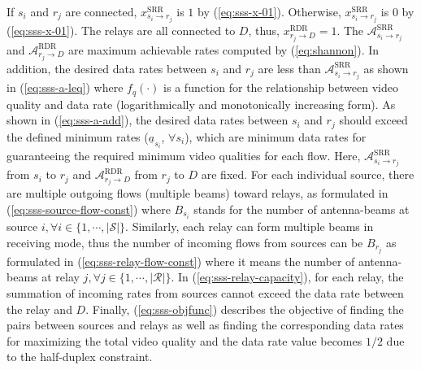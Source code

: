 \documentclass[conference]{IEEEtran}
\begin{document}
If $s_{i}$ and $r_{j}$ are connected, $x_{s_{i}\rightarrow r_{j}}^{\text{SRR}}$ is $1$ by (\ref{eq:sss-x-01}). Otherwise, $x_{s_{i}\rightarrow r_{j}}^{\text{SRR}}$ is $0$ by (\ref{eq:sss-x-01}).
The relays are all connected to $D$, thus, $x_{r_{j}\rightarrow D}^{\text{RDR}} = 1$.
The $\mathcal{A}_{s_{i}\rightarrow r_{j}}^{\text{SRR}}$ and $\mathcal{A}_{r_{j}\rightarrow D}^{\text{RDR}}$ are maximum achievable rates computed by (\ref{eq:shannon}).
In addition, the desired data rates between $s_{i}$ and $r_{j}$ are less than $\mathcal{A}_{s_{i}\rightarrow r_{j}}^{\text{SRR}}$ as shown in (\ref{eq:sss-a-leq}) where $f_{q}\left(\cdot\right)$ is a function for the relationship between video quality and data rate (logarithmically and monotonically increasing form).
As shown in (\ref{eq:sss-a-add}), the desired data rates between $s_{i}$ and $r_{j}$ should exceed the defined minimum rates ($\underline{a}_{s_{i}}$, $\forall s_{i}$), which are minimum data rates for guaranteeing the required minimum video qualities for each flow.
Here, $\mathcal{A}_{s_{i}\rightarrow r_{j}}^{\text{SRR}}$ from $s_{i}$ to $r_{j}$ and $\mathcal{A}_{r_{j}\rightarrow D}^{\text{RDR}}$ from $r_{j}$ to $D$ are fixed.
For each individual source, there are multiple outgoing flows (multiple beams) toward relays, as formulated in (\ref{eq:sss-source-flow-const}) where $B_{s_{i}}$ stands for the number of antenna-beams at source $i, \forall i\in\{1,\cdots,|\mathcal{S}|\}$.
Similarly, each relay can form multiple beams in receiving mode, thus the number of incoming flows from sources can be $B_{r_{j}}$ as formulated in (\ref{eq:sss-relay-flow-const}) where it means the number of antenna-beams at relay $j, \forall j\in\{1,\cdots,|\mathcal{R}|\}$.
In (\ref{eq:sss-relay-capacity}), for each relay, the summation of incoming rates from sources cannot exceed the data rate between the relay and $D$.
Finally, (\ref{eq:sss-objfunc}) describes the objective of finding the pairs between sources and relays as well as finding the corresponding data rates for maximizing the total video quality and the data rate value becomes $1/2$ due to the half-duplex constraint.
\end{document}
